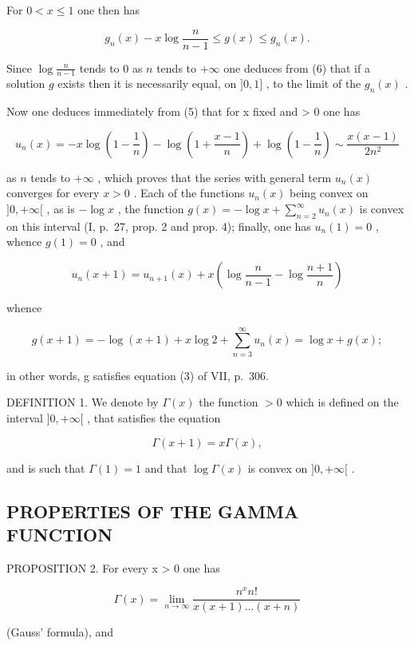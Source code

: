 For \(0 < x \leqslant 1\) one then has

\[
g _ {n} (x) - x \log \frac {n}{n - 1} \leqslant g (x) \leqslant g _ {n} (x).\tag{6}
\]

Since \(\log \frac{n}{n - 1}\) tends to 0 as \(n\) tends to \(+\infty\) one deduces from (6) that if a solution \(g\) exists then it is necessarily equal, on \(]0, 1]\) , to the limit of the \(g_n(x)\) .

Now one deduces immediately from (5) that for x fixed and \textgreater{} 0 one has

\[
u _ {n} (x) = - x \log \left(1 - \frac {1}{n}\right) - \log \left(1 + \frac {x - 1}{n}\right) + \log \left(1 - \frac {1}{n}\right) \sim \frac {x (x - 1)}{2 n ^ {2}}
\]

as \(n\) tends to \(+\infty\) , which proves that the series with general term \(u_{n}(x)\) converges for every \(x > 0\) . Each of the functions \(u_{n}(x)\) being convex on \(]0, +\infty[\) , as is \(-\log x\) , the function \(g(x) = -\log x + \sum_{n=2}^{\infty} u_{n}(x)\) is convex on this interval (I, p.~27, prop. 2 and prop. 4); finally, one has \(u_{n}(1) = 0\) , whence \(g(1) = 0\) , and

\[
u _ {n} (x + 1) = u _ {n + 1} (x) + x \left(\log \frac {n}{n - 1} - \log \frac {n + 1}{n}\right)
\]

whence

\[
g (x + 1) = - \log (x + 1) + x \log 2 + \sum_ {n = 3} ^ {\infty} u _ {n} (x) = \log x + g (x);
\]

in other words, g satisfies equation (3) of VII, p.~306.

DEFINITION 1. We denote by \(\Gamma(x)\) the function \(>0\) which is defined on the interval \(]0, +\infty[\) , that satisfies the equation

\[
\Gamma (x + 1) = x \Gamma (x),\tag{7}
\]

and is such that \(\Gamma(1) = 1\) and that \(\log \Gamma(x)\) is convex on \(]0, +\infty[\) .

\subsection{PROPERTIES OF THE GAMMA FUNCTION}

PROPOSITION 2. For every x \textgreater{} 0 one has

\[
\Gamma (x) = \lim _ {n \rightarrow \infty} \frac {n ^ {x} n !}{x (x + 1) \dots (x + n)}\tag{8}
\]

(Gauss' formula), and

